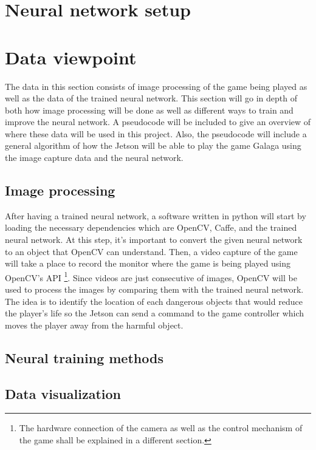 \documentclass{scrreprt}
\begin{document}
\section{Neural network setup}%

\section{Data viewpoint}%

The data in this section consists of image processing of the game being played as well as the data of the trained neural network.
This section will go in depth of both how image processing will be done as well as different ways to train and improve the neural network.
A pseudocode will be included to give an overview of where these data will be used in this project.
Also, the pseudocode will include a general algorithm of how the Jetson will be able to play the game Galaga using the image capture data and the neural network.

\subsection{Image processing}%

After having a trained neural network, a software written in python will start by loading the necessary dependencies which are OpenCV, Caffe, and the trained neural network.
At this step, it’s important to convert the given neural network to an object that OpenCV can understand.
Then, a video capture of the game will take a place to record the monitor where the game is being played using OpenCV's API
\footnote{The hardware connection of the camera as well as the control mechanism of the game shall be explained in a different section.}.
Since videos are just consecutive of images, OpenCV will be used to process the images by comparing them with the trained neural network.
The idea is to identify the location of each dangerous objects that would reduce the player’s life so the Jetson can send a command to the game controller which moves the player away from the harmful object.

\subsection{Neural training methods}%

\subsection{Data visualization}%
\end{document}
